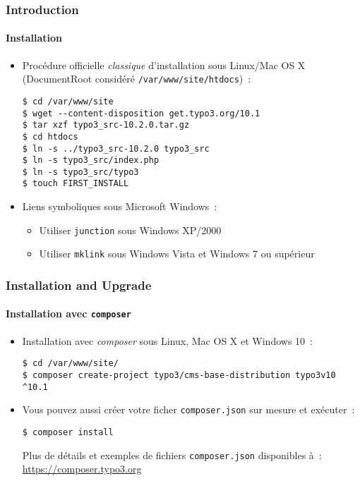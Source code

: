 
\begin{frame}[fragile]
	\frametitle{Introduction}
	\framesubtitle{Installation}

	\begin{itemize}
		\item Procédure officielle \textit{classique} d'installation sous Linux/Mac OS X\newline
			(DocumentRoot considéré \texttt{/var/www/site/htdocs})~:
\begin{lstlisting}
$ cd /var/www/site
$ wget --content-disposition get.typo3.org/10.1
$ tar xzf typo3_src-10.2.0.tar.gz
$ cd htdocs
$ ln -s ../typo3_src-10.2.0 typo3_src
$ ln -s typo3_src/index.php
$ ln -s typo3_src/typo3
$ touch FIRST_INSTALL
\end{lstlisting}

		\item Liens symboliques sous Microsoft Windows~:

			\begin{itemize}
				\item Utiliser \texttt{junction} sous Windows XP/2000
				\item Utiliser \texttt{mklink} sous Windows Vista et Windows 7 ou supérieur
			\end{itemize}

	\end{itemize}
\end{frame}


\begin{frame}[fragile]
	\frametitle{Installation and Upgrade}
	\framesubtitle{Installation avec \texttt{composer}}

	\begin{itemize}
		\item Installation avec \textit{composer} sous Linux, Mac OS X et Windows 10~:
\begin{lstlisting}
$ cd /var/www/site/
$ composer create-project typo3/cms-base-distribution typo3v10 ^10.1
\end{lstlisting}

		\item Vous pouvez aussi créer votre ficher \texttt{composer.json} sur mesure
			et exécuter~:
\begin{lstlisting}
$ composer install
\end{lstlisting}

			Plus de détails et exemples de fichiers \texttt{composer.json} disponibles à~:\newline
			\smaller
				\href{https://composer.typo3.org}{https://composer.typo3.org}
			\normalsize

	\end{itemize}
\end{frame}


